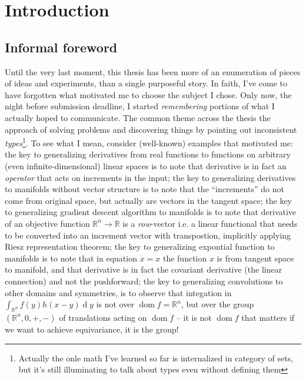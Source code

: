 \chapter{Introduction}


\section*{Informal foreword}

Until the very last moment, this thesis has been more of an enumeration of
pieces of ideas and experiments, than a single purposeful story. In faith, I've
come to have forgotten what motivated me to choose the subject I chose.  Only
now, the night before submission deadline, I started \emph{remembering}
portions of what I actually hoped to communicate. The common theme across the
thesis the approach of solving problems and discovering things by pointing out
inconsistent \emph{types}\footnote{Actually the onle math I've learned so far
is internalized in category of sets, but it's still illuminating to talk about
types even without defining them}. To see what I mean, consider (well-known)
examples that motivated me: the key to generalizing derivatives from real
functions to functions on arbitrary (even infinite-dimensional) linear spaces
is to note that derivative is in fact an \emph{operator} that acts on
increments in the input; the key to generalizing derivatives to manifolds
without vector structure is to note that the ``increments'' do not come from
original space, but actually are vectors in the tangent space; the key to
generalizing gradient descent algorithm to manifolds is to note that derivative
of an objective function $\mathbb{R}^n \to \mathbb{R}$ is a \emph{row}-vector
i.e. a linear functional that needs to be converted into an increment vector
with transpostion, implicitly applying Riesz representation theorem; the key to
generalizing expontial function to manifolds is to note that in equation
$\dot{x} = x$ the function $x$ is from tangent space to manifold, and that
derivative is in fact the covariant derivative (the linear connection) and not
the pushforward; the key to generalizing convolutions to other domains and
symmetries, is to observe that integation in $\int_{\mathbb{R}^n}
f(y)h(x-y)\operatorname{d}y$ is not over $\operatorname{dom}f=\mathbb{R}^n$,
but over the group $(\mathbb{R}^n,0,+,-)$ of translations acting on
$\operatorname{dom}f$ -- it is not $\operatorname{dom}f$ that matters if we
want to achieve equivariance, it is the group!

